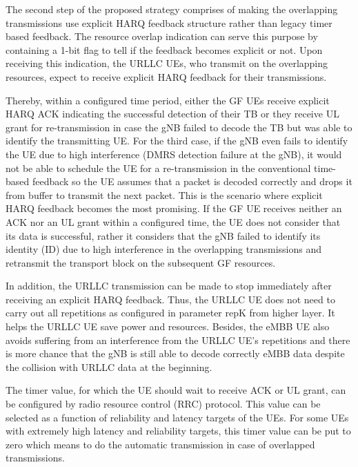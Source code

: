\documentclass[conference]{IEEEtran}
\begin{document}
The second step of the proposed strategy comprises of making the overlapping transmissions use explicit HARQ feedback structure rather than legacy timer based feedback. The resource overlap indication can serve this purpose by containing a 1-bit flag to tell if the feedback becomes explicit or not. Upon receiving this indication, the URLLC UEs, who transmit on the overlapping resources, expect to receive explicit HARQ feedback for their transmissions. 

Thereby, within a configured time period, either the GF UEs receive explicit HARQ ACK indicating the successful detection of their TB or they receive UL grant for re-transmission in case the gNB failed to decode the TB but was able to identify the transmitting UE.  For the third case, if the gNB even fails to identify the UE due to high interference (DMRS detection failure at the gNB), it would not be able to schedule the UE for a re-transmission in the conventional time-based feedback so the UE assumes that a packet is decoded correctly and drops it from buffer to transmit the next packet. This is the scenario where explicit HARQ feedback becomes the most promising. If the GF UE receives neither an ACK nor an UL grant within a configured time, the UE does not consider that its data is successful, rather it considers that the gNB failed to identify its identity (ID) due to high interference in the overlapping transmissions and retransmit the transport block on the subsequent GF resources.

In addition, the URLLC transmission can be made to stop immediately after receiving an explicit HARQ feedback. Thus, the URLLC UE does not need to carry out all repetitions as configured in parameter repK from higher layer. It helps the URLLC UE save power and resources. Besides, the eMBB UE also avoids suffering from an interference from the URLLC UE’s repetitions and there is more chance that the gNB is still able to decode correctly eMBB data despite the collision with URLLC data at the beginning. 

The timer value, for which the UE should wait to receive ACK or UL grant, can be configured by radio resource control (RRC) protocol. This value can be selected as a function of reliability and latency targets of the UEs. For some UEs with extremely high latency and reliability targets, this timer value can be put to zero which means to do the automatic transmission in case of overlapped transmissions.
\end{document}
